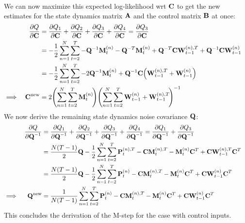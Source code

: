 		We can now maximize this expected log-likelihood \ac{wrt} \(\mat{C}\) to get the new estimates for the state dynamics matrix \(\mat{A}\) and the control matrix \(\mat{B}\) at once:
		\begin{align*}
			&& \pdv{Q}{\mat{C}}
				&= \pdv{Q_1}{\mat{C}} + \pdv{Q_2}{\mat{C}} + \pdv{Q_3}{\mat{C}} + \pdv{Q_4}{\mat{C}} = \pdv{Q_3}{\mat{C}} & \\
			&&	&= -\frac{1}{2} \sum_{n = 1}^{N} \sum_{t = 2}^{T} -\mat{Q}^{-1} \mat{M}_t^{(n)} - \mat{Q}^{-T} \mat{M}_t^{(n)} + \mat{Q}^{-T} \mat{C} \mat{W}_{t - 1}^{(n), T} + \mat{Q}^{-1} \mat{C} \mat{W}_{t - 1}^{(n)} & \\
			&&	&= -\frac{1}{2} \sum_{n = 1}^{N} \sum_{t = 2}^{T} -2\mat{Q}^{-1} \mat{M}_t^{(n)} + \mat{Q}^{-1} \mat{C} \Big( \mat{W}_{t - 1}^{(n), T} + \mat{W}_{t - 1}^{(n)} \Big) & \\
			\implies && \mat{C}^\new &= 2 \Bigg(\! \sum_{n = 1}^{N} \sum_{t = 2}^{T} \mat{M}_t^{(n)} \!\Bigg) \Bigg(\! \sum_{n = 1}^{N} \sum_{t = 2}^{T} \mat{W}_{t - 1}^{(n)} + \mat{W}_{t - 1}^{(n), T} \!\Bigg)^{-1} &
		\end{align*}
		We now derive the remaining state dynamics noise covariance \(\mat{Q}\):
		\begin{align*}
			&& \pdv{Q}{\mat{Q}^{-1}}
				&= \pdv{Q_1}{\mat{Q}^{-1}} + \pdv{Q_2}{\mat{Q}^{-1}} + \pdv{Q_3}{\mat{Q}^{-1}} + \pdv{Q_4}{\mat{Q}^{-1}} = \pdv{Q_1}{\mat{Q}^{-1}} + \pdv{Q_3}{\mat{Q}^{-1}} & \\
			&&	&= \frac{N (T - 1)}{2} \mat{Q} - \frac{1}{2} \sum_{n = 1}^{N} \sum_{t = 2}^{T} \mat{P}_t^{(n), T} - \mat{C} \mat{M}_t^{(n), T} - \mat{M}_t^{(n)} \mat{C}^T + \mat{C} \mat{W}_{t - 1}^{(n), T} \mat{C}^T & \\
			&&	&= \frac{N (T - 1)}{2} \mat{Q} - \frac{1}{2} \sum_{n = 1}^{N} \sum_{t = 2}^{T} \mat{P}_t^{(n)} - \mat{C} \mat{M}_t^{(n), T} - \mat{M}_t^{(n)} \mat{C}^T + \mat{C} \mat{W}_{t - 1}^{(n)} \mat{C}^T & \\
			\implies && \mat{Q}^\new &= \frac{1}{N (T - 1)} \sum_{n = 1}^{N} \sum_{t = 2}^{T} \mat{P}_t^{(n)} - \mat{C} \mat{M}_t^{(n), T} - \mat{M}_t^{(n)} \mat{C}^T + \mat{C} \mat{W}_{t - 1}^{(n)} \mat{C}^T &
		\end{align*}
		This concludes the derivation of the M-step for the case with control inputs.

